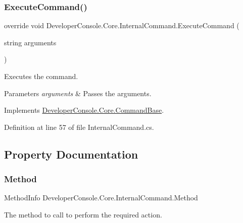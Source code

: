 \subsubsection{\texorpdfstring{Execute\+Command()}{ExecuteCommand()}}
{\footnotesize\ttfamily override void Developer\+Console.\+Core.\+Internal\+Command.\+Execute\+Command (\begin{DoxyParamCaption}\item[{string}]{arguments }\end{DoxyParamCaption})\hspace{0.3cm}{\ttfamily [virtual]}}



Executes the command. 


\begin{DoxyParams}{Parameters}
{\em arguments} & Passes the arguments.\\
\hline
\end{DoxyParams}


Implements \hyperlink{class_developer_console_1_1_core_1_1_command_base_ab68054239b7e3d2a47029839f90d59ca}{Developer\+Console.\+Core.\+Command\+Base}.



Definition at line 57 of file Internal\+Command.\+cs.



\subsection{Property Documentation}
\mbox{\label{class_developer_console_1_1_core_1_1_internal_command_aa37dedf92763807179b659eeb035064f}} 
\subsubsection{\texorpdfstring{Method}{Method}}
{\footnotesize\ttfamily Method\+Info Developer\+Console.\+Core.\+Internal\+Command.\+Method\hspace{0.3cm}{\ttfamily [get]}}



The method to call to perform the required action. 



